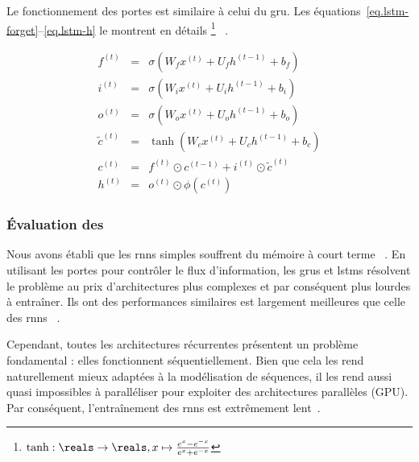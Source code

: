 Le fonctionnement des portes est similaire à celui du \gls{gru}.
Les équations~\ref{eq.lstm-forget}--\ref{eq.lstm-h} le montrent en détails%
\footnote{\(\tanh:\reals\to\reals, x\mapsto \frac{e^x - e^{-x}}{e^x + e^{-x}}\)}
~\cite{Hochreiter_Schmidhuber_1997}.

\begin{eqnarray}
    \label{eq.lstm-forget}
    f^{(t)} &=&\sigma\left(W_f x^{(t)}+U_f h^{(t-1)}+b_f\right) \\
    \label{eq.lstm-input}
    i^{(t)} &=&\sigma\left(W_i x^{(t)}+U_i h^{(t-1)}+b_i\right) \\
    \label{eq.lstm-out}
    o^{(t)} &=&\sigma\left(W_o x^{(t)}+U_o h^{(t-1)}+b_o\right) \\
    \label{eq.lstm-ctilde}
    \tilde{c}^{(t)} &=&\tanh\left(W_c x^{(t)}+U_c h^{(t-1)}+b_c\right) \\
    \label{eq.lstm-c}
    c^{(t)} &=&f^{(t)} \odot c^{(t-1)}+i^{(t)} \odot \tilde{c}^{(t)} \\
    \label{eq.lstm-h}
    h^{(t)} &=&o^{(t)} \odot \phi\left(c^{(t)}\right)
\end{eqnarray}

\subsubsection{Évaluation des }

Nous avons établi que les \glspl{rnn} simples souffrent du mémoire à court terme%
~\cite{Bengio_Simard_Frasconi_1994,Pascanu_Mikolov_Bengio}.
En utilisant les portes pour contrôler le flux d'information,
les \glspl{gru} et \glspl{lstm} résolvent le problème au prix d'architectures plus complexes
et par conséquent plus lourdes à entraîner.
Ils ont des performances similaires est largement meilleures que celle des \glspl{rnn}%
~\cite{Chung_Gulcehre_Cho_Bengio_2014}.

Cependant, toutes les architectures récurrentes présentent un problème fondamental : 
elles fonctionnent séquentiellement.
Bien que cela les rend naturellement mieux adaptées à la modélisation de séquences,
il les rend aussi quasi impossibles à paralléliser pour exploiter des architectures parallèles (GPU).
Par conséquent, l'entraînement des \glspl{rnn} est extrêmement lent~\cite{Stahlberg_2020}.
